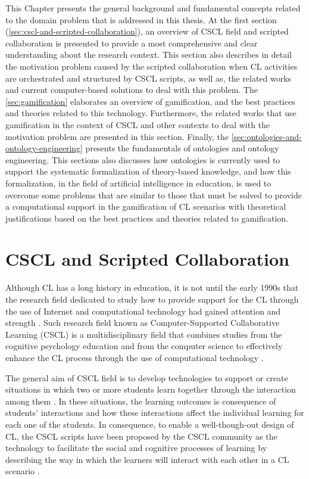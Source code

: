 This Chapter presents the general background and fundamental concepts related to the domain problem that is addressed in this thesis. At the first section (\autoref{sec:cscl-and-scripted-collaboration}), an overview of CSCL field and scripted collaboration is presented to provide a most comprehensive and clear understanding about the research context. This section also describes in detail the motivation problem caused by the scripted collaboration when CL activities are orchestrated and structured by CSCL scripts, as well as, the related works and current computer-based solutions to deal with this problem. The \autoref{sec:gamification} elaborates an overview of gamification, and the best practices and theories related to this technology. Furthermore, the related works that use gamification in the context of CSCL and other contexts to deal with the motivation problem are presented in this section. Finally, the \autoref{sec:ontologies-and-ontology-engineering} presents the fundamentals of ontologies and ontology engineering. This sections also discusses how ontologies is currently used to support the systematic formalization of theory-based knowledge, and how this formalization, in the field of artificial intelligence in education, is used to overcome some problems that are similar to those that must be solved to provide a computational support in the gamification of CL scenarios with theoretical justifications based on the best practices and theories related to gamification. 

\section{CSCL and Scripted Collaboration}
\label{sec:cscl-and-scripted-collaboration}

Although CL has a long history in education, it is not until the early 1990s that the research field dedicated to study how to provide support for the CL through the use of Internet and computational technology had gained attention and strength \cite{StahlKoschmannSuthers2006}. Such research field known as Computer-Supported Collaborative Learning (CSCL) is a multidisciplinary field that combines studies from the cognitive psychology education and from the computer science to effectively enhance the CL process through the use of computational technology \cite{HoppeOgataSoller2007}.

The general aim of CSCL field is to develop technologies to support or create situations in which two or more students learn together through the interaction among them \cite{Dillenbourg1999}. In these situations, the learning outcomes is consequence of students' interactions and how these interactions affect the individual learning for each one of the students. In consequence, to enable a well-though-out design of CL, the CSCL scripts have been proposed by the CSCL community as the technology to facilitate the social and cognitive processes of learning by describing the way in which the learners will interact with each other in a CL scenario \cite{HarrerKobbeMalzahn2007}.

